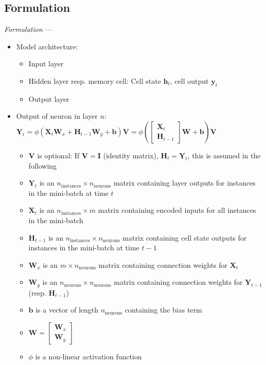 \subsection*{Formulation}
\emph{Formulation} --- 
\begin{itemize}
    \item Model architecture: 
    \begin{itemize}
        \item Input layer
        \item Hidden layer resp. memory cell: Cell state $\boldsymbol{h}_t$, cell output $\boldsymbol{y}_t$
        \item Output layer
    \end{itemize}
    \item Output of neuron in layer $n$: \\
    $
    \boldsymbol{Y}_{t} = \phi \left( \boldsymbol{X}_{t} \boldsymbol{W}_{x} + \boldsymbol{H}_{t-1} \boldsymbol{W}_{y} + \boldsymbol{b} \right) \boldsymbol{V}
    = \phi \left( \begin{bmatrix} \boldsymbol{X}_{t} \\ \boldsymbol{H}_{t-1} \end{bmatrix} \boldsymbol{W} + \boldsymbol{b} \right) \boldsymbol{V}
    $
    \begin{itemize}
        \item $\boldsymbol{V}$ is optional: If $\boldsymbol{V} = \boldsymbol{I}$ (identity matrix), $\boldsymbol{H}_{t} = \boldsymbol{Y}_{t}$, this is assumed in the following
        \item $\boldsymbol{Y}_{t}$ is an $n_{\text{instances}} \times n_{\text{neurons}}$ matrix containing layer outputs for instances in the mini-batch at time $t$
        \item $\boldsymbol{X}_{t}$ is an $n_{\text{instances}} \times m$ matrix containing encoded inputs for all instances in the mini-batch
        \item $\boldsymbol{H}_{t-1}$ is an $n_{\text{instances}} \times n_{\text{neurons}}$ matrix containing cell state outputs for instances in the mini-batch at time $t-1$
        \item $\boldsymbol{W}_{x}$ is an $m \times n_{\text{neurons}}$ matrix containing connection weights for $\boldsymbol{X}_{t}$
        \item $\boldsymbol{W}_{y}$ is an $n_{\text{neurons}} \times n_{\text{neurons}}$ matrix containing connection weights for $\boldsymbol{Y}_{t-1}$ (resp. $\boldsymbol{H}_{t-1}$)
        \item $\boldsymbol{b}$ is a vector of length $n_{\text{neurons}}$ containing the bias term
        \item $\boldsymbol{W} = \begin{bmatrix} \boldsymbol{W}_{x} \\ \boldsymbol{W}_{y} \end{bmatrix}$
        \item $\phi$ is a non-linear activation function
    \end{itemize}
\end{itemize}


